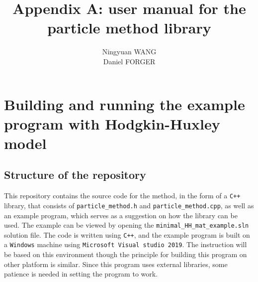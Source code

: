 \documentclass[10pt]{article} %
\title{Appendix A: user manual for the particle method library}
\author{\sc Ningyuan WANG\\Daniel FORGER
}
\begin{document}
\setlength{\parindent}{0pt}
\maketitle

\section{Building and running the example program with Hodgkin-Huxley model}
\subsection{Structure of the repository}
This repository contains the source code for the method, in the form of a \texttt{C++} library, that consists of \texttt{particle\_method.h} and \texttt{particle\_method.cpp}, as well as an example program, which serves as a suggestion on how the library can be used. The example can be viewed by opening the \texttt{minimal\_HH\_mat\_example.sln} solution file.
The code is written using \texttt{C++}, and the example program is built on a \texttt{Windows} machine using \texttt{Microsoft Visual studio 2019}. The instruction will be based on this environment though the principle for building this program on other platform is similar. Since this program uses external libraries, some patience is needed in setting the program to work.
\end{document}

